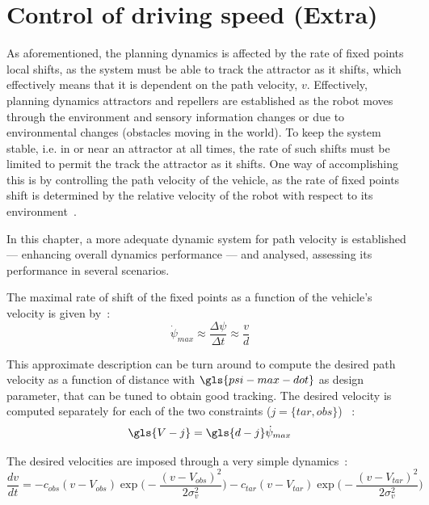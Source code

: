 \chapter{Control of driving speed (Extra)}%
\label{cha:contr-driv-speed}
As aforementioned, the planning dynamics is affected by the rate of fixed points
local shifts, as the system must be able to track the attractor as it
shifts, which effectively means that it is dependent on the path velocity, $v$.
Effectively, planning dynamics attractors and repellers are established as the
robot moves through the environment and sensory information 
changes or due to environmental changes (obstacles moving in the world). To keep
the system stable, i.e. in or near an attractor at all times, the rate of such
shifts must be limited to permit the track the attractor as it shifts. One way
of accomplishing this is by controlling the path velocity of the vehicle, as the
rate of fixed points shift is determined by the relative velocity of the robot
with respect to its environment~\cite{bicho2000dynamic}.

In this chapter, a more adequate dynamic system for path velocity is established
--- enhancing overall dynamics performance --- and analysed, assessing its
performance in several scenarios.

The maximal rate of shift of the fixed points as a function of the vehicle's
velocity is given by~\cite{bicho2000dynamic}:
\begin{equation}
  \label{eq:37}
  \dot\psi_{max} \approx \frac{\Delta \psi}{\Delta t} \approx \frac{v}{d}
\end{equation}

This approximate description can be turn around to compute the desired path
velocity as a function of distance with $\gls{psi-max-dot}$ as design parameter,
that can be tuned to obtain good tracking. The desired velocity is computed
separately for each of the two constraints ($j = \{tar, obs\}$)
~\cite{bicho2000dynamic}:
\begin{equation}
  \label{eq:38}
  \gls{V-j} = \gls{d-j} \dot \psi_{max}
\end{equation}

The desired velocities are imposed through a very simple dynamics~\cite{bicho1997dynamic}:
\begin{equation}
  \label{eq:39}
  \frac{dv}{dt} = 
- c_{obs}(v - V_{obs}) \exp \Big( - \frac{(v- V_{obs})^2}{2 \sigma_v ^2}  \Big)
- c_{tar}(v - V_{tar}) \exp \Big( - \frac{(v- V_{tar})^2}{2 \sigma_v ^2}  \Big)
\end{equation}

